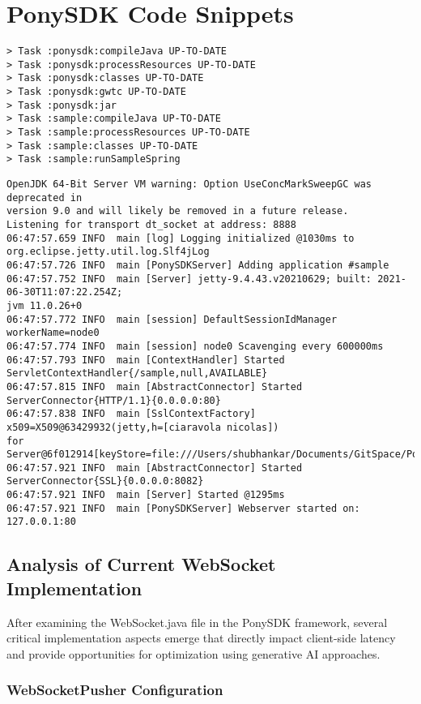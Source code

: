 \documentclass[a4paper, 11pt, twoside, openright]{report}
\begin{document}
\section{PonySDK Code Snippets}
\begin{verbatim}
> Task :ponysdk:compileJava UP-TO-DATE
> Task :ponysdk:processResources UP-TO-DATE
> Task :ponysdk:classes UP-TO-DATE
> Task :ponysdk:gwtc UP-TO-DATE
> Task :ponysdk:jar
> Task :sample:compileJava UP-TO-DATE
> Task :sample:processResources UP-TO-DATE
> Task :sample:classes UP-TO-DATE
> Task :sample:runSampleSpring
\end{verbatim}

\begin{Verbatim}[breaklines]
OpenJDK 64-Bit Server VM warning: Option UseConcMarkSweepGC was deprecated in 
version 9.0 and will likely be removed in a future release.
Listening for transport dt_socket at address: 8888
06:47:57.659 INFO  main [log] Logging initialized @1030ms to 
org.eclipse.jetty.util.log.Slf4jLog
06:47:57.726 INFO  main [PonySDKServer] Adding application #sample
06:47:57.752 INFO  main [Server] jetty-9.4.43.v20210629; built: 2021-06-30T11:07:22.254Z;
jvm 11.0.26+0
06:47:57.772 INFO  main [session] DefaultSessionIdManager workerName=node0
06:47:57.774 INFO  main [session] node0 Scavenging every 600000ms
06:47:57.793 INFO  main [ContextHandler] Started ServletContextHandler{/sample,null,AVAILABLE}
06:47:57.815 INFO  main [AbstractConnector] Started ServerConnector{HTTP/1.1}{0.0.0.0:80}
06:47:57.838 INFO  main [SslContextFactory] x509=X509@63429932(jetty,h=[ciaravola nicolas])
for Server@6f012914[keyStore=file:///Users/shubhankar/Documents/GitSpace/PonySDK/keystore]
06:47:57.921 INFO  main [AbstractConnector] Started ServerConnector{SSL}{0.0.0.0:8082}
06:47:57.921 INFO  main [Server] Started @1295ms
06:47:57.921 INFO  main [PonySDKServer] Webserver started on: 127.0.0.1:80
\end{Verbatim}

\subsection{Analysis of Current WebSocket Implementation}

After examining the WebSocket.java file in the PonySDK framework, several critical implementation aspects emerge that directly impact client-side latency and provide opportunities for optimization using generative AI approaches.

\subsubsection{WebSocketPusher Configuration}
\end{document}
